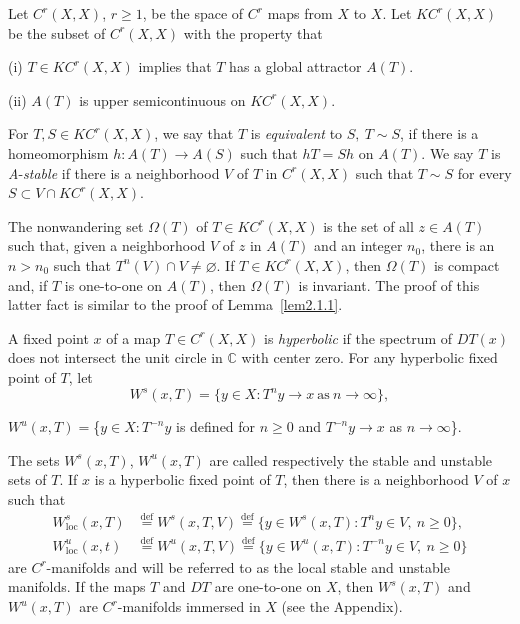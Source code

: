 \documentclass{surv-l}
\theoremstyle{plain}
\theoremstyle{definition}
\numberwithin{equation}{section}
\numberwithin{figure}{chapter}
\begin{document}
Let $C^{r}(X, X)$, $r\geq 1$, be the space of $C^{r}$ maps from $X$ to $X$. Let $KC^{r}(X, X)$ be the subset of $C^{r}(X, X)$ with the property that

(i) $T\in KC^{r}(X, X)$ implies that $T$ has a global attractor $A(T)$.

(ii) $A(T)$ is upper semicontinuous on $KC^{r}(X, X)$.

For $T, S\in KC^{r}(X, X)$, we say that $T$ is \emph{equivalent} to $S,\ T\sim S$, if there is a homeomorphism $h\!:A(T)\rightarrow A(S)$ such that $hT=Sh$ on $A(T)$. We say $T$ is \emph{A}-\emph{stable} if there is a neighborhood $V$ of $T$ in $C^{r}(X, X)$ such that $T\sim S$ for every $S\subset V\cap KC^{r}(X, X)$.

The nonwandering set $\Omega(T)$ of $T\in KC^{r}(X, X)$ is the set of all $z\in A(T)$ such that, given a neighborhood $V$ of $z$ in $A(T)$ and an integer $n_{0}$, there is an $n>n_{0}$ such that $ T^{n}(V)\cap V\neq\varnothing$. If $T\in KC^{r}(X, X)$, then $\Omega(T)$ is compact and, if $T$ is one-to-one on $A(T)$, then $\Omega(T)$ is invariant. The proof of this latter fact is similar to the proof of Lemma~\ref{lem2.1.1}.

A fixed point $x$ of a map $T\in C^{r}(X, X)$ is \emph{hyperbolic} if the spectrum of $DT(x)$ does not intersect the unit circle in $\mathbb{C}$ with center zero. For any hyperbolic fixed point of $T$, let
\begin{equation*}
W^{s}(x, T)=\{y\in X\!: T^{n}y\rightarrow x\ \mathrm{as}\ n\rightarrow\infty\},
\end{equation*}

$W^{u}(x, T)=$\{$y\in X\!:T^{-n}y$ is defined for $n\geq 0$ and $T^{-n}y\rightarrow x$ as $ n\rightarrow\infty$\}.

The sets $W^{s}(x, T)$, $W^{u}(x, T)$ are called respectively the stable and unstable sets of $T$. If $x$ is a hyperbolic fixed point of $T$, then there is a neighborhood $V$ of $x$ such that
\begin{align*}
W_{\mathrm{loc}}^{s}(x, T) & {\overset{\mathrm{def}}=} W^{s}(x, T, V){\overset{\mathrm{def}}=}\{y\in W^{s}(x, T)\!:T^{n}y\in V,\ n\geq 0\},\\
W_{\mathrm{loc}}^{u}(x, t)& {\overset{\mathrm{def}}=}W^{u}(x, T, V){\overset{\mathrm{def}}=}\{y\in W^{u}(x, T)\!:T^{-n}y\in V,\ n\geq 0\}
\end{align*}
are $C^{r}$-manifolds and will be referred to as the local stable and unstable manifolds. If the maps $T$ and $DT$ are one-to-one on $X$, then $W^{s}(x, T)$ and $W^{u}(x, T)$ are $C^{r}$-manifolds immersed in $X$ (see the Appendix).
\end{document}
